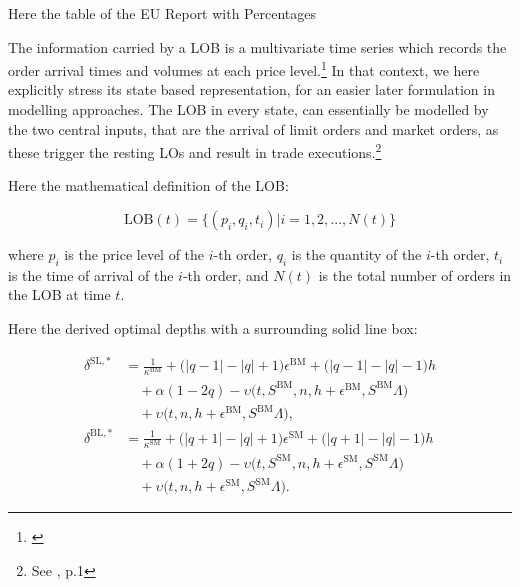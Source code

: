 \documentclass[12pt,a4paper]{cau_thesis}
\begin{document}
Here the table of the EU Report with Percentages

The information carried by a LOB is a multivariate time series which
records the order arrival times and volumes at each price
level.\footnote{\cite[See ][, p.13]{law2015pure}} In that context, we
here explicitly stress its state based representation, for an easier
later formulation in modelling approaches. The LOB in every state,
can essentially be modelled by the two central inputs, that are the
arrival of limit orders and market orders, as these trigger the
resting LOs and result in trade executions.\footnote{See
    \cite{wu2020single}, p.1}

Here the mathematical definition of the LOB:
\begin{definition}[LOB]
    \begin{equation}
        \text{LOB}(t) = \{(p_i, q_i, t_i) | i = 1, 2, ..., N(t)\}
    \end{equation}
    \label{def:lob}
\end{definition}

where \(p_i\) is the price level of the \(i\)-th order, \(q_i\) is
the quantity of the \(i\)-th order, \(t_i\) is the time of arrival of
the \(i\)-th order, and \(N(t)\) is the total number of orders in the
LOB at time \(t\).

Here the derived optimal depths with a surrounding solid line box:

\begin{boxedequationblock}
    \begin{equation}\label{eq:optimal_depths_box}
        \begin{aligned}
            \delta^{\mathrm{SL},*}
            &= \frac{1}{\kappa^{\mathrm{BM}}}
               + \bigl(|q-1|-|q|+1\bigr)\epsilon^{\mathrm{BM}}
               + \bigl(|q-1|-|q|-1\bigr)h \\
            &\quad + \alpha(1-2q)
               - \upsilon\bigl(t,S^{\mathrm{BM}},n,h+\epsilon^{\mathrm{BM}},S^{\mathrm{BM}}\Lambda\bigr) \\
            &\quad + \upsilon\bigl(t,n,h+\epsilon^{\mathrm{BM}},S^{\mathrm{BM}}\Lambda\bigr), \\[0.5em]
            \delta^{\mathrm{BL},*}
            &= \frac{1}{\kappa^{\mathrm{SM}}}
               + \bigl(|q+1|-|q|+1\bigr)\epsilon^{\mathrm{SM}}
               + \bigl(|q+1|-|q|-1\bigr)h \\
            &\quad + \alpha(1+2q)
               - \upsilon\bigl(t,S^{\mathrm{SM}},n,h+\epsilon^{\mathrm{SM}},S^{\mathrm{SM}}\Lambda\bigr) \\
            &\quad + \upsilon\bigl(t,n,h+\epsilon^{\mathrm{SM}},S^{\mathrm{SM}}\Lambda\bigr).
        \end{aligned}
    \end{equation}
\end{boxedequationblock}
\end{document}
